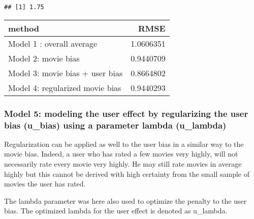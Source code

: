 \documentclass[
]{article}
\newenvironment{Shaded}{\begin{snugshade}}{\end{snugshade}}
\newcommand{\DataTypeTok}[1]{\textcolor[rgb]{0.13,0.29,0.53}{#1}}
\newcommand{\KeywordTok}[1]{\textcolor[rgb]{0.13,0.29,0.53}{\textbf{#1}}}
\newcommand{\NormalTok}[1]{#1}
\newcommand{\OperatorTok}[1]{\textcolor[rgb]{0.81,0.36,0.00}{\textbf{#1}}}
\newcommand{\StringTok}[1]{\textcolor[rgb]{0.31,0.60,0.02}{#1}}
\begin{document}
\begin{verbatim}
## [1] 1.75
\end{verbatim}

\begin{Shaded}
\end{Shaded}

\begin{longtable}[]{@{}lr@{}}
\toprule
method & RMSE\tabularnewline
\midrule
\endhead
Model 1 : overall average & 1.0606351\tabularnewline
Model 2: movie bias & 0.9440709\tabularnewline
Model 3: movie bias + user bias & 0.8664802\tabularnewline
Model 4: regularized movie bias & 0.9440293\tabularnewline
\bottomrule
\end{longtable}

\hypertarget{model-5-modeling-the-user-effect-by-regularizing-the-user-bias-u_bias-using-a-parameter-lambda-u_lambda}{%
\subsubsection{Model 5: modeling the user effect by regularizing the
user bias (u\_bias) using a parameter lambda
(u\_lambda)}\label{model-5-modeling-the-user-effect-by-regularizing-the-user-bias-u_bias-using-a-parameter-lambda-u_lambda}}

Regularization can be applied as well to the user bias in a similar way
to the movie bias. Indeed, a user who has rated a few movies very
highly, will not necessarily rate every movie very highly. He may still
rate movies in average highly but this cannot be derived with high
certainty from the small sample of movies the user has rated.

The lambda parameter was here also used to optimize the penalty to the
user bias. The optimized lambda for the user effect is denoted as
u\_lambda.
\end{document}
